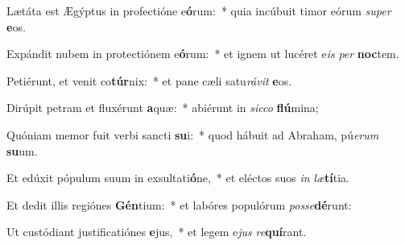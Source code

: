 \item Lætáta est Ægýptus in profectióne e\textbf{ó}rum:~* quia incúbuit timor eórum \textit{su}\textit{per} \textbf{e}os.
\item Expándit nubem in protectiónem e\textbf{ó}rum:~* et ignem ut lucéret e\textit{is} \textit{per} \textbf{noc}tem.
\item Petiérunt, et venit co\textbf{túr}nix:~* et pane cæli satu\textit{rá}\textit{vit} \textbf{e}os.
\item Dirúpit petram et fluxérunt \textbf{a}quæ:~* abiérunt in \textit{sic}\textit{co} \textbf{flú}mina;
\item Quóniam memor fuit verbi sancti \textbf{su}i:~* quod hábuit ad Abraham, pú\textit{e}\textit{rum} \textbf{su}um.
\item Et edúxit pópulum suum in exsultati\textbf{ó}ne,~* et eléctos suos \textit{in} \textit{læ}\textbf{tí}tia.
\item Et dedit illis regiónes \textbf{Gén}tium:~* et labóres populórum \textit{pos}\textit{se}\textbf{dé}runt:
\item Ut custódiant justificatiónes \textbf{e}jus,~* et legem e\textit{jus} \textit{re}\textbf{quí}rant.
